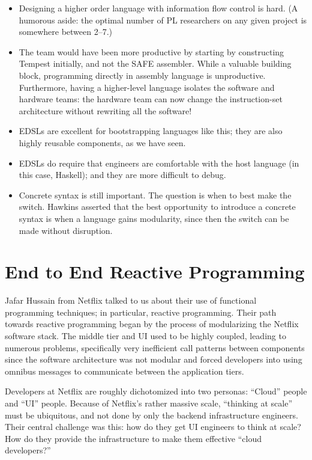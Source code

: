\documentclass{jfp1}
\begin{document}
\begin{itemize}

\item Designing a higher order language with information flow control
is hard. (A humorous aside: the optimal number of PL researchers on
any given project is somewhere between 2--7.)

\item The team would have been more productive by starting by constructing
Tempest initially, and not the SAFE assembler. While a valuable building block,
programming directly in assembly language is unproductive. Furthermore,
having a higher-level language isolates the software and hardware teams:
the hardware team can now change the instruction-set architecture
without rewriting all the software!

\item EDSLs are excellent for bootstrapping languages like this; they are also 
highly reusable components, as we have seen.

\item EDSLs do require that engineers are comfortable with the host language
(in this case, Haskell); and they are more difficult to debug.

\item Concrete syntax is still important. The question is when to best make
the switch. Hawkins asserted that the best opportunity to introduce a concrete
syntax is when a language gains modularity, since then the switch can be made
without disruption.

\end{itemize}

\section{End to End Reactive Programming}


Jafar Hussain from Netflix talked to us about their use of functional
programming techniques; in particular, reactive programming. Their
path towards reactive programming began by the process of
modularizing the Netflix software stack. The middle tier and UI
used to be highly coupled, leading to numerous problems, specifically very
inefficient call patterns between components since the software
architecture was not modular and forced developers into using
omnibus messages to communicate between the application tiers.

Developers at Netflix are roughly dichotomized into two personas:
``Cloud'' people and ``UI'' people. Because of Netflix's rather
massive scale, ``thinking at scale'' must be ubiquitous, and not done
by only the backend infrastructure engineers. Their central challenge
was this: how do they get UI engineers to think at scale? How do they
provide the infrastructure to make them effective ``cloud
developers?''
\end{document}
